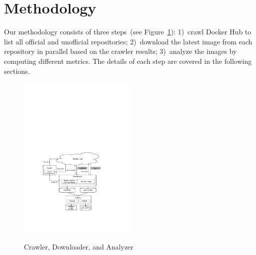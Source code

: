 \section{Methodology}
\label{sec:methodology}



Our methodology consists of three steps~(see Figure~\ref{fig-downloader-analyzer}):
1)~crawl Docker Hub to list all official and unofficial repositories; 2)~download the
latest image from each repository in parallel based on the crawler results; 3)~analyze
the images by computing different metrics.
%
%
%
The details of each step are covered in the following sections.
%
%
%
%


\begin{figure}
	\centering
	\includegraphics[width=0.5\textwidth]{graphs/fig-downloader-analyzer.pdf}\\
	\caption{Crawler, Downloader, and Analyzer}\label{fig-downloader-analyzer}
\end{figure}

